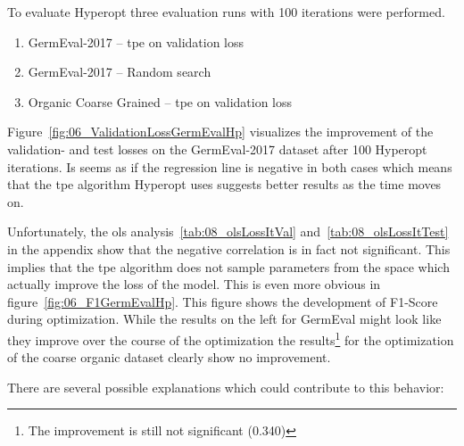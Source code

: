 To evaluate Hyperopt three evaluation runs with 100 iterations were performed.

\begin{enumerate}
	\item GermEval-2017 -- \gls{tpe} on validation loss
	\item GermEval-2017 -- Random search
	\item Organic Coarse Grained -- \gls{tpe} on validation loss
\end{enumerate}

Figure~\ref{fig:06_ValidationLossGermEvalHp} visualizes the improvement of the validation- and test losses on the GermEval-2017 dataset after 100 Hyperopt iterations. Is seems as if the regression line is negative in both cases which means that the \gls{tpe} algorithm Hyperopt uses suggests better results as the time moves on.

Unfortunately, the \gls{ols} analysis~\ref{tab:08_olsLossItVal} and~\ref{tab:08_olsLossItTest} in the appendix show that the negative correlation is in fact not significant. This implies that the \gls{tpe} algorithm does not sample parameters from the space which actually improve the loss of the model. This is even more obvious in figure~\ref{fig:06_F1GermEvalHp}. This figure shows the development of F1-Score during optimization. While the results on the left for GermEval might look like they improve over the course of the optimization the results\footnote{The improvement is still not significant {(0.340)}} for the optimization of the coarse organic dataset clearly show no improvement.
\medskip

There are several possible explanations which could contribute to this behavior:

